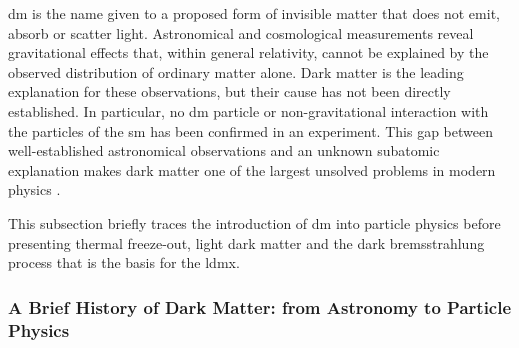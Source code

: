 \Gls{dm} is the name given to a proposed form of invisible matter that does not
emit, absorb or scatter light. Astronomical and cosmological measurements reveal
gravitational effects that, within general relativity, cannot be explained by the
observed distribution of ordinary matter alone. Dark matter is the leading
explanation for these observations, but their cause has not been directly
established. In particular, no \gls{dm} particle or non-gravitational interaction
with the particles of the \gls{sm} has been confirmed in an experiment. This gap
between well-established astronomical observations and an unknown subatomic
explanation makes dark matter one of the largest unsolved problems in modern
physics \cite{bertone2016-history-dark-matter,cirelli2026-darkmatter}.






This subsection briefly traces the introduction of \gls{dm} into particle
physics before presenting thermal freeze-out, light dark matter and the dark
bremsstrahlung process that is the basis for the \gls{ldmx}.

\subsubsection{A Brief History of Dark Matter: from Astronomy to Particle Physics}
\label{sec:history}

